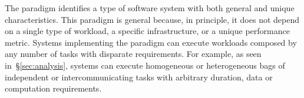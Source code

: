 \documentclass{sig-alternate}
\begin{document}






The \pilot paradigm identifies a type of software system with both general and
unique characteristics. This paradigm is general because, in principle, it does
not depend on a single type of workload, a specific infrastructure, or a unique
performance metric. Systems implementing the \pilot paradigm can execute
workloads composed by any number of tasks with disparate requirements. For
example, as seen in~\S\ref{sec:analysis}, \pilot systems can execute
homogeneous or heterogeneous bags of independent or intercommunicating tasks
with arbitrary duration, data or computation requirements.
\end{document}
